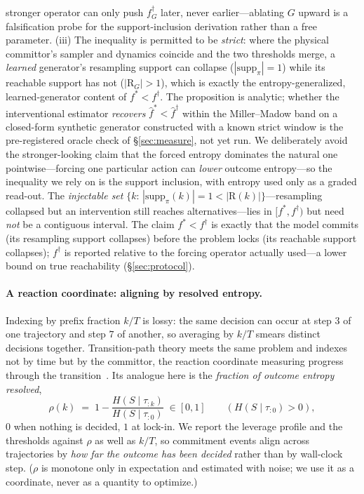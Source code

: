 \documentclass[11pt]{article}
\newcommand{\strat}{S}
\begin{document}
stronger operator can only push $f^\dagger_G$ later, never earlier---ablating $G$
upward is a falsification probe for the support-inclusion derivation rather than a
free parameter. (iii) The inequality is permitted to be \emph{strict}: where the
physical committor's sampler and dynamics coincide and the two thresholds merge, a
\emph{learned} generator's resampling support can collapse ($|\mathrm{supp}_\pi|=1$)
while its reachable support has not ($|\mathrm{R}_G|>1$), which is exactly the
entropy-generalized, learned-generator content of $f^\ast<f^\dagger$. The
proposition is analytic; whether the interventional estimator \emph{recovers}
$\widehat f^\ast<\widehat f^\dagger$ within the Miller--Madow band on a closed-form
synthetic generator constructed with a known strict window is the pre-registered
oracle check of \S\ref{sec:measure}, not yet run. We deliberately avoid the stronger-looking claim that the forced
entropy dominates the natural one pointwise---forcing one particular action can
\emph{lower} outcome entropy---so the inequality we rely on is the support
inclusion, with entropy used only as a graded read-out. The \emph{injectable set}
$\{k:\,|\mathrm{supp}_\pi(k)|=1<|\mathrm{R}(k)|\}$---resampling collapsed but an
intervention still reaches alternatives---lies in $[f^\ast,f^\dagger)$ but need
\emph{not} be a contiguous interval. The claim $f^\ast<f^\dagger$ is exactly that
the model commits (its resampling support collapses) before the problem locks (its
reachable support collapses); $f^\dagger$ is reported relative to the forcing
operator actually used---a lower bound on true reachability (\S\ref{sec:protocol}).

\paragraph{A reaction coordinate: aligning by resolved entropy.}
Indexing by prefix fraction $k/T$ is lossy: the same decision can occur at step $3$
of one trajectory and step $7$ of another, so averaging by $k/T$ smears distinct
decisions together. Transition-path theory meets the same problem and indexes not by
time but by the committor, the reaction coordinate measuring progress through the
transition~\citep{evanden2010tpt}. Its analogue here is the \emph{fraction of outcome
entropy resolved},
\begin{equation}
\rho(k)\;=\;1-\frac{H(\strat\mid\tau_{:k})}{H(\strat\mid\tau_{:0})}\;\in[0,1]
\qquad (H(\strat\mid\tau_{:0})>0),
\end{equation}
$0$ when nothing is decided, $1$ at lock-in. We report the leverage profile and the
thresholds against $\rho$ as well as $k/T$, so commitment events align across
trajectories by \emph{how far the outcome has been decided} rather than by wall-clock
step. ($\rho$ is monotone only in expectation and estimated with noise; we use it as
a coordinate, never as a quantity to optimize.)
\end{document}

